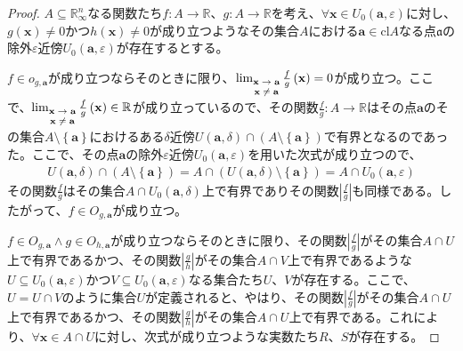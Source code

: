 \documentclass[dvipdfmx]{jsarticle}
\begin{document}
\begin{proof}
$A \subseteq \mathbb{R}_{\infty}^{n}$なる関数たち$f:A \rightarrow \mathbb{R}$、$g:A \rightarrow \mathbb{R}$を考え、$\forall\mathbf{x} \in U_{0}\left( \mathbf{a},\varepsilon \right)$に対し、$g\left( \mathbf{x} \right) \neq 0$かつ$h\left( \mathbf{x} \right) \neq 0$が成り立つようなその集合$A$における$\mathbf{a} \in \mathrm{cl}A$なる点$\mathfrak{a}$の除外$\varepsilon$近傍$U_{0}\left( \mathbf{a},\varepsilon \right)$が存在するとする。\par
$f \in o_{g,\mathbf{a}}$が成り立つならそのときに限り、$\lim_{\scriptsize \begin{matrix}
\mathbf{x} \rightarrow \mathbf{a} \\
\mathbf{x} \neq \mathbf{a} \\
\end{matrix}}{\frac{f}{g}\left( \mathbf{x} \right)} = 0$が成り立つ。ここで、$\lim_{\scriptsize \begin{matrix}
\mathbf{x} \rightarrow \mathbf{a} \\
\mathbf{x} \neq \mathbf{a} \\
\end{matrix}}{\frac{f}{g}\left( \mathbf{x} \right)} \in \mathbb{R}$が成り立っているので、その関数$\frac{f}{g}:A \rightarrow \mathbb{R}$はその点$\mathbf{a}$のその集合$A \setminus \left\{ \mathbf{a} \right\}$におけるある$\delta$近傍$U\left( \mathbf{a},\delta \right) \cap \left( A \setminus \left\{ \mathbf{a} \right\} \right)$で有界となるのであった。ここで、その点$\mathbf{a}$の除外$\varepsilon$近傍$U_{0}\left( \mathbf{a},\varepsilon \right)$を用いた次式が成り立つので、
\begin{align*}
U\left( \mathbf{a},\delta \right) \cap \left( A \setminus \left\{ \mathbf{a} \right\} \right) = A \cap \left( U\left( \mathbf{a},\delta \right) \setminus \left\{ \mathbf{a} \right\} \right) = A \cap U_{0}\left( \mathbf{a},\varepsilon \right)
\end{align*}
その関数$\frac{f}{g}$はその集合$A \cap U_{0}\left( \mathbf{a},\delta \right)$上で有界でありその関数$\left| \frac{f}{g} \right|$も同様である。したがって、$f \in O_{g,\mathbf{a}}$が成り立つ。\par
$f \in O_{g,\mathbf{a}} \land g \in O_{h,\mathbf{a}}$が成り立つならそのときに限り、その関数$\left| \frac{f}{g} \right|$がその集合$A \cap U$上で有界であるかつ、その関数$\left| \frac{g}{h} \right|$がその集合$A \cap V$上で有界であるような$U \subseteq U_{0}\left( \mathbf{a},\varepsilon \right)$かつ$V \subseteq U_{0}\left( \mathbf{a},\varepsilon \right)$なる集合たち$U$、$V$が存在する。ここで、$U = U \cap V$のように集合$U$が定義されると、やはり、その関数$\left| \frac{f}{g} \right|$がその集合$A \cap U$上で有界であるかつ、その関数$\left| \frac{g}{h} \right|$がその集合$A \cap U$上で有界である。これにより、$\forall\mathbf{x} \in A \cap U$に対し、次式が成り立つような実数たち$R$、$S$が存在する。

\end{proof}
\end{document}
